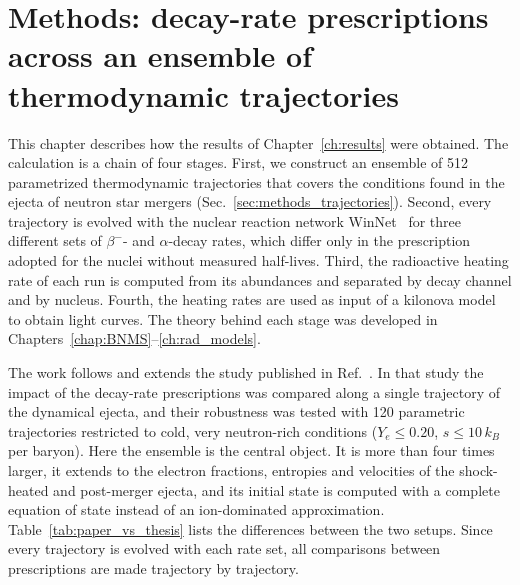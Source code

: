 \chapter{Methods: decay-rate prescriptions across an ensemble of thermodynamic trajectories}\label{ch:methods}

This chapter describes how the results of Chapter~\ref{ch:results} were obtained.
The calculation is a chain of four stages.
First, we construct an ensemble of 512 parametrized thermodynamic trajectories that covers the conditions found in the ejecta of neutron star mergers (Sec.~\ref{sec:methods_trajectories}).
Second, every trajectory is evolved with the nuclear reaction network WinNet~\cite{reichert_nuclear_2023} for three different sets of $\beta^-$- and $\alpha$-decay rates, which differ only in the prescription adopted for the nuclei without measured half-lives.
Third, the radioactive heating rate of each run is computed from its abundances and separated by decay channel and by nucleus.
Fourth, the heating rates are used as input of a kilonova model to obtain light curves.
The theory behind each stage was developed in Chapters~\ref{chap:BNMS}--\ref{ch:rad_models}.

The work follows and extends the study published in Ref.~\cite{hernandez_porras_features_2027}.
In that study the impact of the decay-rate prescriptions was compared along a single trajectory of the dynamical ejecta, and their robustness was tested with 120 parametric trajectories restricted to cold, very neutron-rich conditions ($Y_e\leq0.20$, $s\leq10\,k_B$ per baryon).
Here the ensemble is the central object.
It is more than four times larger, it extends to the electron fractions, entropies and velocities of the shock-heated and post-merger ejecta, and its initial state is computed with a complete equation of state instead of an ion-dominated approximation.
Table~\ref{tab:paper_vs_thesis} lists the differences between the two setups.
Since every trajectory is evolved with each rate set, all comparisons between prescriptions are made trajectory by trajectory.

